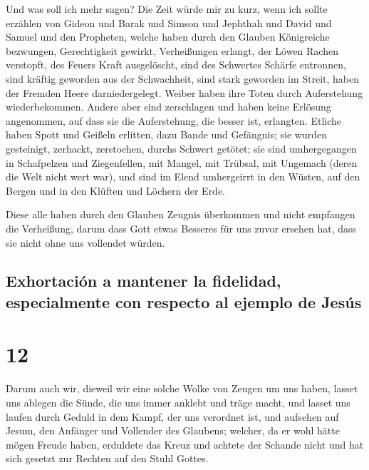  Und was soll ich mehr sagen? Die Zeit würde mir zu kurz,
wenn ich sollte erzählen von Gideon und Barak und Simson und Jephthah
und David und Samuel und den Propheten,  welche haben
durch den Glauben Königreiche bezwungen, Gerechtigkeit gewirkt,
Verheißungen erlangt, der Löwen Rachen verstopft,  des
Feuers Kraft ausgelöscht, sind des Schwertes Schärfe entronnen, sind
kräftig geworden aus der Schwachheit, sind stark geworden im Streit,
haben der Fremden Heere darniedergelegt.  Weiber haben
ihre Toten durch Auferstehung wiederbekommen. Andere aber sind
zerschlagen und haben keine Erlösung angenommen, auf dass sie die
Auferstehung, die besser ist, erlangten.  Etliche haben
Spott und Geißeln erlitten, dazu Bande und Gefängnis; 
sie wurden gesteinigt, zerhackt, zerstochen, durchs Schwert getötet; sie
sind umhergegangen in Schafpelzen und Ziegenfellen, mit Mangel, mit
Trübsal, mit Ungemach  (deren die Welt nicht wert war),
und sind im Elend umhergeirrt in den Wüsten, auf den Bergen und in den
Klüften und Löchern der Erde.

 Diese alle haben durch den Glauben Zeugnis überkommen
und nicht empfangen die Verheißung,  darum dass Gott
etwas Besseres für uns zuvor ersehen hat, dass sie nicht ohne uns
vollendet würden.

\hypertarget{exhortaciuxf3n-a-mantener-la-fidelidad-especialmente-con-respecto-al-ejemplo-de-jesuxfas}{%
\subsection{Exhortación a mantener la fidelidad, especialmente con
respecto al ejemplo de
Jesús}\label{exhortaciuxf3n-a-mantener-la-fidelidad-especialmente-con-respecto-al-ejemplo-de-jesuxfas}}

\hypertarget{section-11}{%
\section{12}\label{section-11}}

 Darum auch wir, dieweil wir eine solche Wolke von Zeugen
um uns haben, lasset uns ablegen die Sünde, die uns immer anklebt und
träge macht, und lasset uns laufen durch Geduld in dem Kampf, der uns
verordnet ist,  und aufsehen auf Jesum, den Anfänger und
Vollender des Glaubens; welcher, da er wohl hätte mögen Freude haben,
erduldete das Kreuz und achtete der Schande nicht und hat sich gesetzt
zur Rechten auf den Stuhl Gottes.

